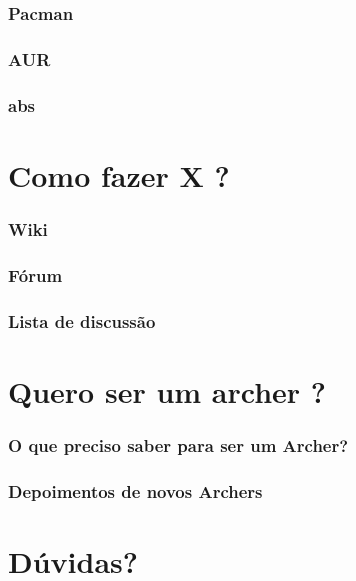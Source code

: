 \documentclass{beamer}
\begin{document}
\begin{frame}
    \frametitle{Pacman}
\end{frame}

\begin{frame}
    \frametitle{AUR}
\end{frame}

\begin{frame}
    \frametitle{abs}
\end{frame}

\section{Como fazer X ? }

\begin{frame}
    \frametitle{Wiki}
\end{frame}

\begin{frame}
    \frametitle{Fórum}
\end{frame}

\begin{frame}
    \frametitle{Lista de discussão} 
\end{frame}

\section{Quero ser um archer ?}

\begin{frame}
    \frametitle{O que preciso saber para ser um Archer?}
\end{frame}

\begin{frame}
    \frametitle{Depoimentos de novos Archers}

\end{frame}


\section{Dúvidas?}
\end{document}
